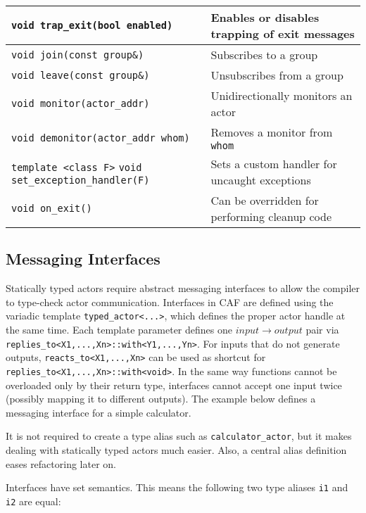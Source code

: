 {\begin{tabular*}{\textwidth}{m{}m{}}
  \hline
  \lstinline^void trap_exit(bool enabled)^ & Enables or disables trapping of exit messages \\
  \hline
  \lstinline^void join(const group&)^ & Subscribes to a group\\
  \hline
  \lstinline^void leave(const group&)^ & Unsubscribes from a group \\
  \hline
  \lstinline^void monitor(actor_addr)^ & Unidirectionally monitors an actor~ \\
  \hline
  \lstinline^void demonitor(actor_addr whom)^ & Removes a monitor from \lstinline^whom^ \\
  \hline
  \lstinline^template <class F>^ \lstinline^void set_exception_handler(F)^ & Sets a custom handler for uncaught exceptions \\
  \hline
  \lstinline^void on_exit()^ & Can be overridden for performing cleanup code \\
  \hline
\end{tabular*}
}
\clearpage

\subsection{Messaging Interfaces}
\label{interface}

Statically typed actors require abstract messaging interfaces to allow the compiler to type-check actor communication.
Interfaces in CAF are defined using the variadic template \lstinline^typed_actor<...>^, which defines the proper actor handle at the same time.
Each template parameter defines one $input \rightarrow output$ pair via \lstinline^replies_to<X1,...,Xn>::with<Y1,...,Yn>^.
For inputs that do not generate outputs, \lstinline^reacts_to<X1,...,Xn>^ can be used as shortcut for \lstinline^replies_to<X1,...,Xn>::with<void>^. In the same way functions cannot be overloaded only by their return type, interfaces cannot accept one input twice (possibly mapping it to different outputs). The example below defines a messaging interface for a simple calculator.



It is not required to create a type alias such as \lstinline^calculator_actor^, but it makes dealing with statically typed actors much easier.
Also, a central alias definition eases refactoring later on.

Interfaces have set semantics. This means the following two type aliases \lstinline^i1^ and \lstinline^i2^ are equal:

